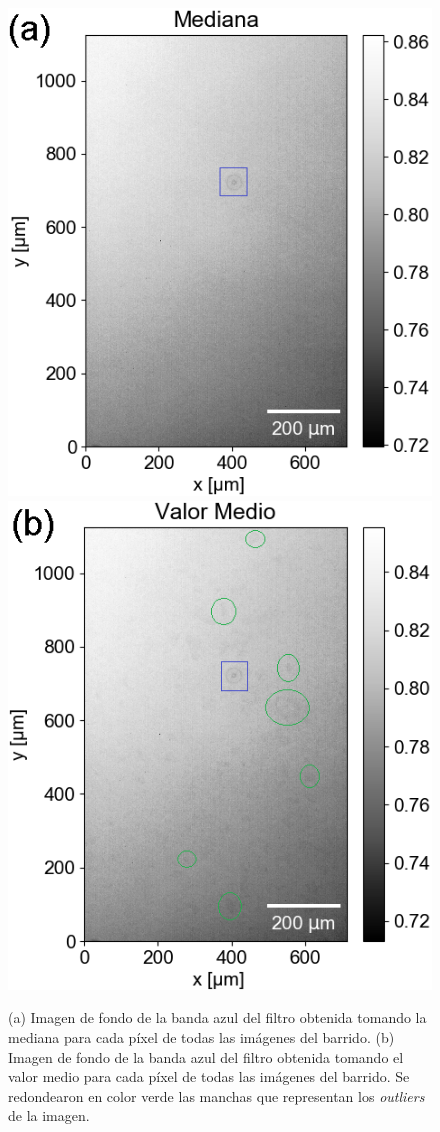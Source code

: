 \begin{figure}[H]
\hfill%
\includegraphics[scale=0.9]{Figs/defectosZEISS/bg_azul.png}
\hfill%
\includegraphics[scale=0.9]{Figs/defectosZEISS/bg_azul_mean.png}
\hfill%
\hfill%
\caption{(a) Imagen de fondo de la banda azul del filtro obtenida tomando la mediana para cada píxel de todas las imágenes del barrido. (b) Imagen de fondo de la banda azul del filtro obtenida tomando el valor medio para cada píxel de todas las imágenes del barrido. Se redondearon en color verde las manchas que representan los \textit{outliers} de la imagen.}
\label{fig:medio}
\end{figure}


